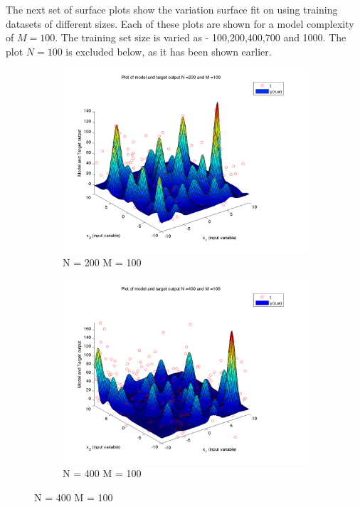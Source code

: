 \documentclass{article}
\begin{document}
\begin{flushleft}
The next set of surface plots show the variation surface fit on using training datasets of different sizes. Each of these plots are shown for a model complexity of $M = 100$. The training set size is varied as - 100,200,400,700 and 1000. The plot $N =100$ is excluded below, as it has been shown earlier.

\end{flushleft}
\begin{figure}[H]

\begin{subfigure}{.5\textwidth}
\centering
\includegraphics[width=\linewidth]{D2/VaryingN_N200M100}
\caption{N = 200 M = 100}
\end{subfigure}
\begin{subfigure}{.5\textwidth}
\includegraphics[width=\linewidth]{D2/VaryingN_N400M100}
\caption{N = 400 M = 100}
\end{subfigure}



\end{figure}
\end{document}
